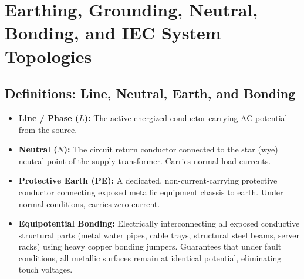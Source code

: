 \section{Earthing, Grounding, Neutral, Bonding, and IEC System Topologies}
\label{sec:earthing_systems}

\subsection{Definitions: Line, Neutral, Earth, and Bonding}
\begin{itemize}
    \item \textbf{Line / Phase ($L$):} The active energized conductor carrying AC potential from the source.
    \item \textbf{Neutral ($N$):} The circuit return conductor connected to the star (wye) neutral point of the supply transformer. Carries normal load currents.
    \item \textbf{Protective Earth (PE):} A dedicated, non-current-carrying protective conductor connecting exposed metallic equipment chassis to earth. Under normal conditions, carries zero current.
    \item \textbf{Equipotential Bonding:} Electrically interconnecting all exposed conductive structural parts (metal water pipes, cable trays, structural steel beams, server racks) using heavy copper bonding jumpers. Guarantees that under fault conditions, all metallic surfaces remain at identical potential, eliminating touch voltages.
\end{itemize}

